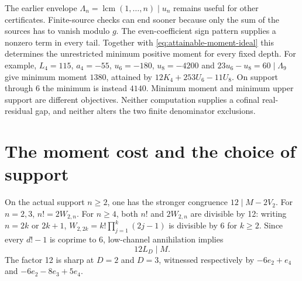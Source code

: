 \documentclass[11pt]{article}
\begin{document}
The earlier envelope $\Lambda_n=\operatorname{lcm}(1,\ldots,n)\mid u_n$
\label{eq:channel-lcm-envelope}
remains useful for other certificates.  Finite-source checks can end sooner
because only the sum of the sources has to vanish modulo $g$.
The even-coefficient sign pattern supplies a nonzero term in every tail.
Together with \eqref{eq:attainable-moment-ideal} this determines the
unrestricted minimum positive moment for every fixed depth.  For example,
$L_4=115$, $a_4=-55$, $u_6=-180$, $u_8=-4200$ and
$23u_6-u_8=60\mid\Lambda_9$ give minimum moment $1380$, attained by
$12K_4+253U_6-11U_8$.  On support through $6$ the minimum is instead $4140$.
Minimum moment and minimum upper support are different objectives.
Neither computation supplies a cofinal real-residual gap, and neither
alters the two finite denominator exclusions.

\section{The moment cost and the choice of support}\label{sec:translator}

On the actual support $n\ge2$, one has the stronger congruence
$12\mid M-2V_2$.  For $n=2,3$, $n!=2W_{2,n}$.  For $n\ge4$, both
$n!$ and $2W_{2,n}$ are divisible by 12: writing $n=2k$ or $2k+1$,
$W_{2,2k}=k!\prod_{j=1}^k(2j-1)$ is divisible by 6 for $k\ge2$.
Since every $d!-1$ is coprime to 6, low-channel annihilation implies
\begin{equation}
12L_D\mid M.\label{eq:twelve-lcm}
\end{equation}
The factor 12 is sharp at $D=2$ and $D=3$, witnessed respectively by
$-6e_2+e_4$ and $-6e_2-8e_3+5e_4$.
\end{document}
